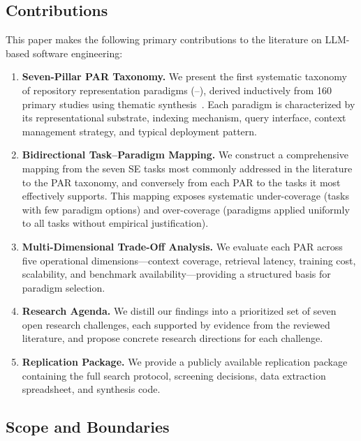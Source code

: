 \subsection{Contributions}

This paper makes the following primary contributions to the literature on LLM-based software
engineering:

\begin{enumerate}[leftmargin=*, label=(\arabic*)]

\item \textbf{Seven-Pillar PAR Taxonomy.} We present the first systematic taxonomy of
  repository representation paradigms (--), derived inductively from 160
  primary studies using thematic synthesis~\cite{cruzes2011thematic}. Each paradigm is
  characterized by its representational substrate, indexing mechanism, query interface,
  context management strategy, and typical deployment pattern.

\item \textbf{Bidirectional Task--Paradigm Mapping.} We construct a comprehensive mapping from
  the seven SE tasks most commonly addressed in the literature to the PAR taxonomy, and
  conversely from each PAR to the tasks it most effectively supports. This mapping exposes
  systematic under-coverage (tasks with few paradigm options) and over-coverage (paradigms
  applied uniformly to all tasks without empirical justification).

\item \textbf{Multi-Dimensional Trade-Off Analysis.} We evaluate each PAR across five
  operational dimensions---context coverage, retrieval latency, training cost, scalability,
  and benchmark availability---providing a structured basis for paradigm selection.

\item \textbf{Research Agenda.} We distill our findings into a prioritized set of seven open
  research challenges, each supported by evidence from the reviewed literature, and propose
  concrete research directions for each challenge.

\item \textbf{Replication Package.} We provide a publicly available replication package
  containing the full search protocol, screening decisions, data extraction spreadsheet, and
  synthesis code.

\end{enumerate}

\subsection{Scope and Boundaries}


